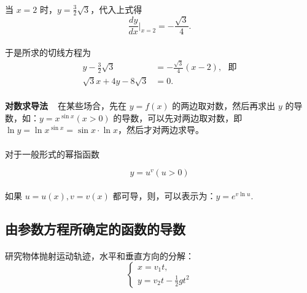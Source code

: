 \paragraph{}
当 $x = 2$ 时，$y = \frac{3}{2}\sqrt{3}$，代入上式得
\begin{equation*}
\frac{dy}{dx}|_{x = 2} = -\frac{\sqrt{3}}{4}.
\end{equation*}
\paragraph{}
于是所求的切线方程为
\begin{align*}
y - \frac{3}{2}\sqrt{3} &= -\frac{\sqrt{3}}{4}(x - 2), \text{~~即}\\
\sqrt{3}x + 4y - 8\sqrt{3} &= 0.
\end{align*}

\paragraph{}
\textbf{对数求导法~~}在某些场合，先在 $y = f(x)$ 的两边取对数，然后再求出 $y$ 的导数，如：$y = x^{\sin x} (x > 0)$ 的导数，可以先对两边取对数，即 $\ln y = \ln x^{\sin x} = \sin x \cdot \ln x$，然后才对两边求导。

\paragraph{}
对于一般形式的幂指函数

\begin{equation}
y = u^v (u > 0)
\end{equation}

\paragraph{}
如果 $u = u(x), v = v(x)$ 都可导，则，可以表示为：$y = e^{v \ln u}.$

\subsection{由参数方程所确定的函数的导数}
\paragraph{}
研究物体抛射运动轨迹，水平和垂直方向的分解：
\begin{equation}
\left\{
  \begin{array}{l}
    x = v_1 t, \\
    y = v_2 t - \frac{1}{2}gt^2
  \end{array}
\right.
\end{equation}

